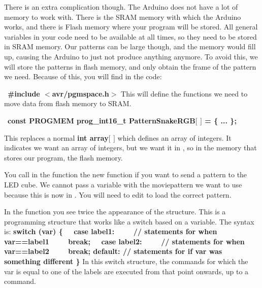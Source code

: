 {There is an extra complication though. The Arduino does not have a lot of memory to work with. There is the SRAM memory with which the Arduino works, and there is Flash memory where your program will be stored. All general variables in your code need to be available at all times, so they need to be stored in SRAM memory. Our patterns can be large though, and the memory would fill up, causing the Arduino to just not produce anything anymore. To avoid this, we will store the patterns in flash memory, and only obtain the frame of the pattern we need. Because of this, you will find in the code:

\textbullet \ \textbf{\#include $<$avr/pgmspace.h$>$}\newline
This will define the functions we need to move data from flash memory to SRAM.

\textbullet \  \textbf{const PROGMEM prog\_int16\_t PatternSnakeRGB{$\lbrack$} {$\rbrack$} = \{ ... \};}\newline

This replaces a normal \textbf{int array{$\lbrack$} {$\rbrack$}} which defines an array of integers. It indicates we want an array of integers, but we want it in , so in the memory that stores our program, the flash memory.

\textbullet You call in the  function the new  function if you want to send a pattern to the LED cube. We cannot pass a variable with the moviepattern we want to use because this is now in . You will need to edit  to load the correct pattern.

\textbullet In the function  you see twice the appearance of the  structure. This is a programming structure that works like a switch based on a variable. The syntax is:\newline
\textbf{switch (var) \{ \newline
\ \  case label1:\newline
\ \ \ \     // statements for when var==label1\newline
\ \ \ \     break;\newline
\ \   case label2:\newline
\ \ \ \     // statements for when var==label2\newline
\ \ \ \     break;\newline
  default: \newline
    // statements for if var was something different\newline
\}}\newline
In this switch structure, the commands for which the var is equal to one of the labels are executed from that point onwards, up to a  command.

}
